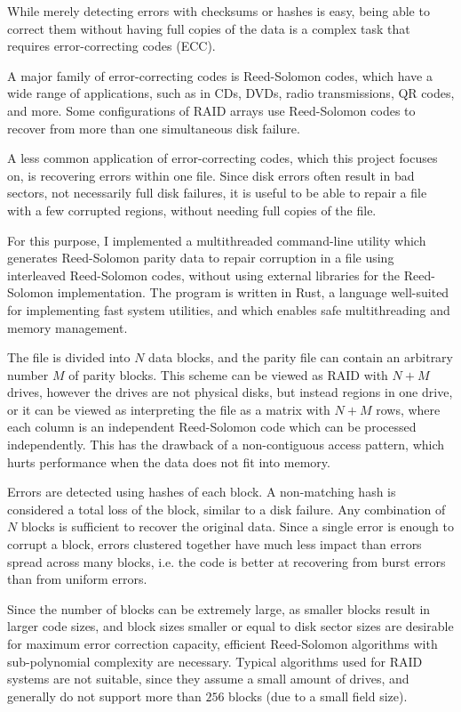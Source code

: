 While merely detecting errors with checksums or hashes is easy, being able to correct them without having full copies of the data is a complex task that requires error-correcting codes (ECC).

A major family of error-correcting codes is Reed-Solomon codes, which have a wide range of applications, such as in CDs, DVDs, radio transmissions, QR codes, and more.
Some configurations of RAID arrays use Reed-Solomon codes to recover from more than one simultaneous disk failure.

A less common application of error-correcting codes, which this project focuses on, is recovering errors within one file.
Since disk errors often result in bad sectors, not necessarily full disk failures, it is useful to be able to repair a file with a few corrupted regions, without needing full copies of the file.

For this purpose, I implemented a multithreaded command-line utility which generates Reed-Solomon parity data to repair corruption in a file using interleaved Reed-Solomon codes, without using external libraries for the Reed-Solomon implementation.
The program is written in Rust, a language well-suited for implementing fast system utilities, and which enables safe multithreading and memory management.

The file is divided into $N$ data blocks, and the parity file can contain an arbitrary number $M$ of parity blocks.
This scheme can be viewed as RAID with $N + M$ drives, however the drives are not physical disks, but instead regions in one drive,
or it can be viewed as interpreting the file as a matrix with $N + M$ rows, where each column is an independent Reed-Solomon code which can be processed independently.
This has the drawback of a non-contiguous access pattern, which hurts performance when the data does not fit into memory.

Errors are detected using hashes of each block. A non-matching hash is considered a total loss of the block, similar to a disk failure. Any combination of $N$ blocks is sufficient to recover the original data.
Since a single error is enough to corrupt a block, errors clustered together have much less impact than errors spread across many blocks, i.e. the code is better at recovering from burst errors than from uniform errors.

Since the number of blocks can be extremely large, as smaller blocks result in larger code sizes, and block sizes smaller or equal to disk sector sizes are desirable for maximum error correction capacity,
efficient Reed-Solomon algorithms with sub-polynomial complexity are necessary.
Typical algorithms used for RAID systems are not suitable, since they assume a small amount of drives, and generally do not support more than $256$ blocks (due to a small field size).

